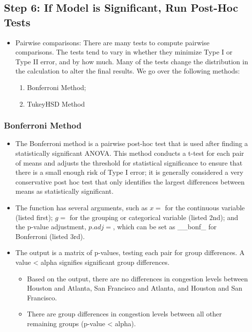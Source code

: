 \documentclass[
  letterpaper,
  DIV=11,
  numbers=noendperiod]{scrreprt}
\providecommand{\tightlist}{%
  \setlength{\itemsep}{0pt}\setlength{\parskip}{0pt}}\usepackage{longtable,booktabs,array}
\begin{document}
\subsection{Step 6: If Model is Significant, Run Post-Hoc
Tests}\label{step-6-if-model-is-significant-run-post-hoc-tests}

\begin{itemize}
\tightlist
\item
  Pairwise comparisons: There are many tests to compute pairwise
  comparisons. The tests tend to vary in whether they minimize Type I or
  Type II error, and by how much. Many of the tests change the
  distribution in the calculation to alter the final results. We go over
  the following methods:

  \begin{enumerate}
  \def\labelenumi{\arabic{enumi}.}
  \tightlist
  \item
    Bonferroni Method;
  \item
    TukeyHSD Method
  \end{enumerate}
\end{itemize}

\subsubsection{Bonferroni Method}\label{bonferroni-method}

\begin{itemize}
\tightlist
\item
  The Bonferroni method is a pairwise post-hoc test that is used after
  finding a statistically significant ANOVA. This method conducts a
  t-test for each pair of means and adjusts the threshold for
  statistical significance to ensure that there is a small enough risk
  of Type I error; it is generally considered a very conservative post
  hoc test that only identifies the largest differences between means as
  statistically significant.
\item
  The function has several arguments, such as \(x =\) for the continuous
  variable (listed first); \(g =\) for the grouping or categorical
  variable (listed 2nd); and the p-value adjustment, \(p.adj =\), which
  can be set as \_\_bonf\_ for Bonferroni (listed 3rd).
\item
  The output is a matrix of p-values, testing each pair for group
  differences. A value \textless{} alpha signifies significant group
  differences.

  \begin{itemize}
  \tightlist
  \item
    Based on the output, there are no differences in congestion levels
    between Houston and Atlanta, San Francisco and Atlanta, and Houston
    and San Francisco.
  \item
    There are group differences in congestion levels between all other
    remaining groups (p-value \textless{} alpha).
  \end{itemize}
\end{itemize}
\end{document}
